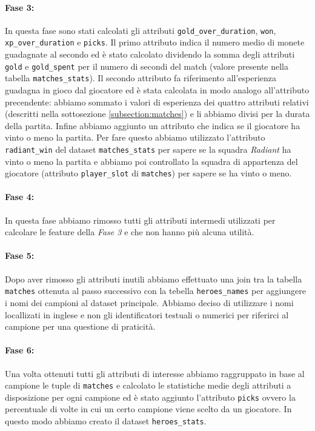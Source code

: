 \documentclass[a4paper,12pt,openany,oneside]{book}
\begin{document}
\paragraph{Fase 3:} In questa fase sono stati calcolati gli attributi \verb|gold_over_duration|, \verb|won|, \verb|xp_over_duration| e \verb|picks|. Il primo attributo indica il numero medio di monete guadagnate al secondo ed è stato calcolato dividendo la somma degli attributi \verb|gold| e \verb|gold_spent| per il numero di secondi del match (valore presente nella tabella \verb|matches_stats|). Il secondo attributo fa riferimento all'esperienza guadagna in gioco dal giocatore ed è stata calcolata in modo analogo all'attributo precendente: abbiamo sommato i valori di esperienza dei quattro attributi relativi (descritti nella sottosezione \ref{subsection:matches}) e li abbiamo divisi per la durata della partita. Infine abbiamo aggiunto un attributo che indica se il giocatore ha vinto o meno la partita. Per fare questo abbiamo utilizzato l'attributo \verb|radiant_win| del dataset \verb|matches_stats| per sapere se la squadra \textit{Radiant} ha vinto o meno la partita e abbiamo poi controllato la squadra di appartenza del giocatore (attributo \verb|player_slot| di \verb|matches|) per sapere se ha vinto o meno.
\paragraph{Fase 4:} In questa fase abbiamo rimosso tutti gli attributi intermedi utilizzati per calcolare le feature della \textit{Fase 3} e che non hanno più alcuna utilità.
\paragraph{Fase 5:} Dopo aver rimosso gli attributi inutili abbiamo effettuato una join tra la tabella \verb|matches| ottenuta al passo successivo con la tebella \verb|heroes_names| per aggiungere i nomi dei campioni al dataset principale. Abbiamo deciso di utilizzare i nomi locallizati in inglese e non gli identificatori testuali o numerici per riferirci al campione per una questione di praticità.
\paragraph{Fase 6:} Una volta ottenuti tutti gli attributi di interesse abbiamo raggruppato in base al campione le tuple di \verb|matches| e calcolato le statistiche medie degli attributi a disposizione per ogni campione ed è stato aggiunto l'attributo \verb|picks| ovvero la percentuale di volte in cui un certo campione viene scelto da un giocatore. In questo modo abbiamo creato il dataset \verb|heroes_stats|.
\end{document}
